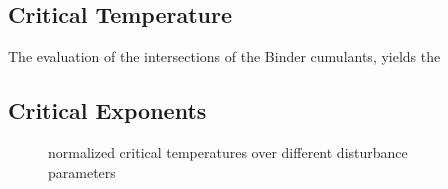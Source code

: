 \subsection{Critical Temperature}
    The evaluation of the intersections of the Binder cumulants, yields
    the

\subsection{Critical Exponents}

    \begin{figure}[htbp]
        \centering
        \caption[Critical Temperature over different disturbance parameters]
                {normalized critical temperatures over different disturbance parameters}
        \label{fig:Tc}
    \end{figure}
